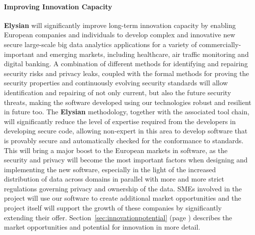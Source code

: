 \documentclass[a4paper,11pt]{article}
\newcommand{\project}[1]{\textbf{#1}\xspace}
\newcommand{\SECURITY}{\project{Elysian}}
\newcommand{\TheProject}{\SECURITY}
\begin{document}
\paragraph*{Improving Innovation Capacity}
\noindent
\TheProject{} will significantly improve long-term innovation capacity by enabling European companies and individuals to develop complex and innovative new secure large-scale big data analytics applications for a variety of commercially-important and emerging markets, including healthcare, air traffic monitoring and digital banking. A combination of different methods for identifying and repairing security risks and privacy leaks, coupled with the formal methods for proving the security properties and continuously evolving security standards will allow identification and repairing of not only current, but also the future security threats, making the software developed using our technologies robust and resilient in future too. The \TheProject{} methodology, together with the associated tool chain, will significantly reduce the level of expertise required from the developers in developing secure code, allowing non-expert in this area to develop software that is provably secure and automatically checked for the conformance to standards. This will bring a major boost to the European markets in software, as the security and privacy will become the most important factors when designing and implementing the new software, especially in the light of the increased distribution of data across domains in parallel with more and more strict regulations governing privacy and ownership of the data. SMEs involved in the project will use our software to create additional market opportunities and the project itself will support the growth of these companies by significantly extending their offer. Section~\ref{sec:innovationpotential} (page \pageref{sec:innovationpotential}) describes the market opportunities and potential for innovation in more detail.
\end{document}
